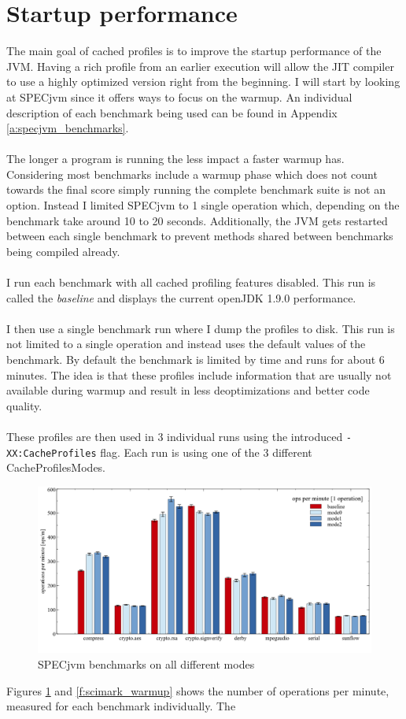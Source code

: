 \section{Startup performance}
\label{s:perf_general}
The main goal of cached profiles is to improve the startup performance of the JVM. Having a rich profile from an earlier execution will allow the JIT compiler to use a highly optimized version right from the beginning.
I will start by looking at SPECjvm since it offers ways to focus on the warmup. An individual description of each benchmark being used can be found in Appendix \ref{a:specjvm_benchmarks}.
\\\\
The longer a program is running the less impact a faster warmup has. Considering most benchmarks include a warmup phase which does not count towards the final score simply running the complete benchmark suite is not an option.
Instead I limited SPECjvm to 1 single operation which, depending on the benchmark take around 10 to 20 seconds.
Additionally, the JVM gets restarted between each single benchmark to prevent methods shared between benchmarks being compiled already.
\\\\
I run each benchmark with all cached profiling features disabled. This run is called the \textit{baseline}     and displays the current openJDK 1.9.0 performance.    
\\\\ 
I then use a single benchmark run where I dump the profiles to disk. This run is not limited to a single operation and instead uses the default values of the benchmark. By default the benchmark is limited by time and runs for about 6 minutes. The idea is that these profiles include information that are usually not available during warmup and result in less deoptimizations and better code quality.
\\\\
These profiles are then used in 3 individual runs using the introduced \texttt{-XX:CacheProfiles} flag. Each run is using one of the 3 different CacheProfilesModes.
\begin{figure}[ht]
  \begin{center}
    \centering
    \includegraphics[width=1.0\textwidth]{figures/others_warmup.png}
    \caption{SPECjvm benchmarks on all different modes}
    \label{f:others_warmup}
  \end{center}
\end{figure}
Figures \ref{f:others_warmup} and \ref{f:scimark_warmup} shows the number of operations per minute, measured for each benchmark individually.
The 

